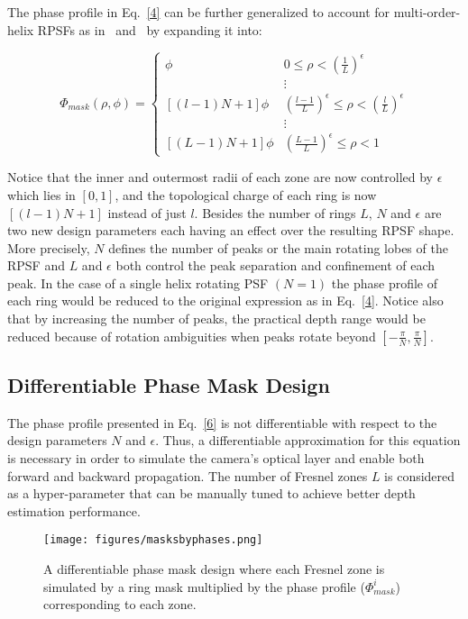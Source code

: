 \documentclass[preprint,5p,twocolumn]{elsarticle}
\begin{document}
The phase profile in Eq.~\ref{4} can be further generalized to account for multi-order-helix RPSFs as in~\cite{kumar2015three} and~\cite{berlich2018high} by expanding it into:

\begin{equation}
\label{6}
    \Phi_{mask}(\rho,\phi) = \begin{cases}
     \phi & 0 \leq \rho < (\frac{1}{L})^{\epsilon}\\
      & \vdots \\
     [(l-1)N+1]\phi & (\frac{l-1}{L})^{\epsilon} \leq \rho < (\frac{l}{L})^{\epsilon}\\
      & \vdots \\
     [(L-1)N+1]\phi & (\frac{L-1}{L})^{\epsilon} \leq \rho < 1
    \end{cases}
\end{equation}

Notice that the inner and outermost radii of each zone are now controlled by $\epsilon$ which lies in $[0,1]$, and the topological charge of each ring is now $[(l-1)N+1]$ instead of just $l$. Besides the number of rings $L$, $N$ and $\epsilon$ are two new design parameters each having an effect over the resulting RPSF shape. More precisely, $N$ defines the number of peaks or the main rotating lobes of the RPSF and $L$ and $\epsilon$ both control the peak separation and confinement of each peak. In the case of a single helix rotating PSF $(N=1)$  the phase profile of each ring would be reduced to the original expression as in Eq.~\ref{4}. Notice also that by increasing the number of peaks, the practical depth range would be reduced because of rotation ambiguities when peaks rotate beyond $[-\frac{\pi}{N},\frac{\pi}{N}]$.


\subsection{Differentiable Phase Mask Design}
\label{subsec:diff_mask_design}
The phase profile presented in Eq.~\ref{6} is not differentiable with respect to the design parameters $N$ and $\epsilon$. Thus, a differentiable approximation for this equation is necessary in order to simulate the camera's optical layer and enable both forward and backward propagation. The number of Fresnel zones $L$ is considered as a hyper-parameter that can be manually tuned to achieve better depth estimation performance.

\begin{figure}[h!]
\centering
\texttt{[image: figures/masksbyphases.png]}
\caption{A differentiable phase mask design where each Fresnel zone is simulated by a ring mask multiplied by the phase profile ($\Phi_{mask}^{i}$) corresponding to each zone.}
\label{fig:masks}
\end{figure}
\end{document}
